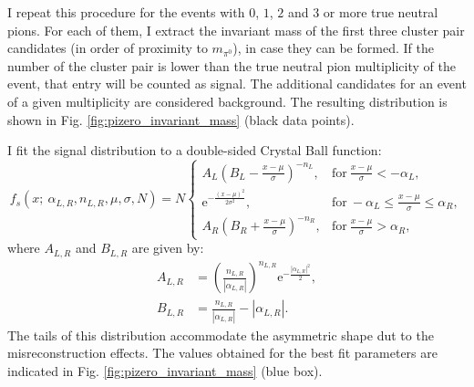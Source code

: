 I repeat this procedure for the events with $0$, $1$, $2$ and $3$ or more true neutral pions. For each of them, I extract the invariant mass of the first three cluster pair candidates (in order of proximity to $m_{\pi^{0}}$), in case they can be formed. If the number of the cluster pair is lower than the true neutral pion multiplicity of the event, that entry will be counted as signal. The additional candidates for an event of a given multiplicity are considered background. The resulting distribution is shown in Fig. \ref{fig:pizero_invariant_mass} (black data points).

I fit the signal distribution to a double-sided Crystal Ball function:
\begin{equation}
    f_{s} (x; ~\alpha_{L,R}, n_{L,R}, \mu, \sigma, N) = N \left\{
    \begin{array}{ll}
        A_{L} \left(B_{L} - \frac{x - \mu}{\sigma}\right)^{-n_{L}}, & \mathrm{for} \ \frac{x - \mu}{\sigma} < -\alpha_{L},\\
        \mathrm{e}^{-\frac{(x-\mu)^{2}}{2 \sigma^{2}}}, & \mathrm{for} \ -\alpha_{L} \leq \frac{x - \mu}{\sigma} \leq \alpha_{R},\\
        A_{R} \left(B_{R} + \frac{x - \mu}{\sigma}\right)^{-n_{R}}, & \mathrm{for} \ \frac{x - \mu}{\sigma} > \alpha_{R},
    \end{array}
    \right.
\end{equation}
where $A_{L,R}$ and $B_{L,R}$ are given by:
\begin{equation}
\begin{split}
    A_{L,R} &= \left(\frac{n_{L,R}}{|\alpha_{L,R}|}\right)^{n_{L,R}} \mathrm{e}^{-\frac{|\alpha_{L,R}|^{2}}{2}},\\
    B_{L,R} &= \frac{n_{L,R}}{|\alpha_{L,R}|}-|\alpha_{L,R}|.
\end{split}
\end{equation}
The tails of this distribution accommodate the asymmetric shape dut to the misreconstruction effects. The values obtained for the best fit parameters are indicated in Fig. \ref{fig:pizero_invariant_mass} (blue box).

